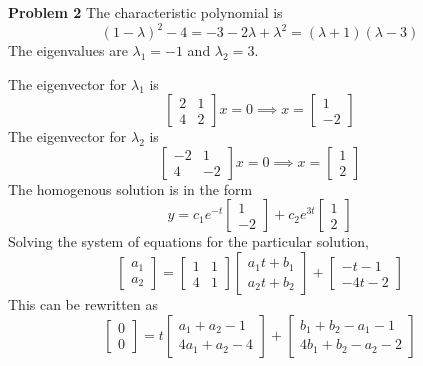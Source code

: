 \textbf{Problem 2}
The characteristic polynomial is 
\[
    (1-\lambda)^2-4
    = -3 -2\lambda + \lambda^2
    = (\lambda+1)(\lambda -3)
\]
The eigenvalues are $\lambda_1 = -1$ and $\lambda_2 = 3$.

The eigenvector for $\lambda_1$ is 
\[
    \begin{bmatrix}
        2 & 1 \\
        4 & 2
    \end{bmatrix} x = 0
    \implies x = \begin{bmatrix}
        1 \\ -2
    \end{bmatrix}
\]
The eigenvector for $\lambda_2$ is 
\[
    \begin{bmatrix}
        -2 & 1 \\
        4 & -2
    \end{bmatrix} x = 0
    \implies x = \begin{bmatrix}
        1 \\ 2
    \end{bmatrix}
\]
The homogenous solution is in the form 
\[
    y = c_1e^{-t} 
    \begin{bmatrix}
        1 \\ -2
    \end{bmatrix} +
    c_2e^{3t}
    \begin{bmatrix}
        1 \\ 2
    \end{bmatrix}
\]
Solving the system of equations for the particular solution,
\[
    \begin{bmatrix}
        a_1 \\ a_2
    \end{bmatrix} = 
    \begin{bmatrix}
        1 & 1 \\
        4 & 1
    \end{bmatrix}
    \begin{bmatrix}
        a_1t + b_1 \\ a_2t + b_2
    \end{bmatrix} +
    \begin{bmatrix}
        -t-1 \\ -4t-2
    \end{bmatrix}
\]
This can be rewritten as 
\[
    \begin{bmatrix}
        0 \\ 0
    \end{bmatrix} = 
    t \begin{bmatrix}
        a_1 + a_2 - 1 \\
        4a_1 + a_2 - 4
    \end{bmatrix} +
    \begin{bmatrix}
        b_1 + b_2 - a_1 - 1 \\
        4b_1 + b_2 - a_2 - 2
    \end{bmatrix} 
\]
